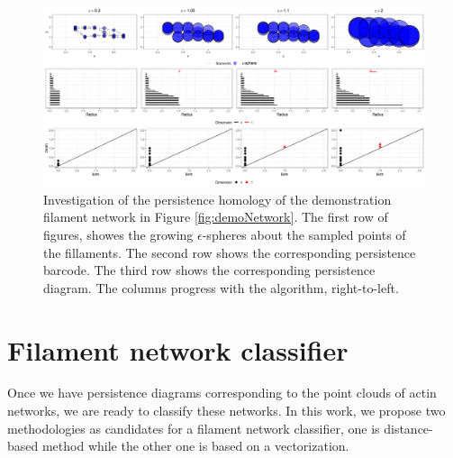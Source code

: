 \documentclass[10pt]{article}
\begin{document}
\begin{figure}[!htbp]
	\begin{center}
		\includegraphics[width=1\textwidth]{figures/filaments_rips.png}
	\end{center}
	\caption{Investigation of the persistence homology of the demonstration filament network in Figure \ref{fig:demoNetwork}. The first row of figures, showes the growing $\epsilon$-spheres about the sampled points of the fillaments. The second row shows the corresponding persistence barcode. The third row shows the corresponding persistence diagram. The columns progress with the algorithm, right-to-left.}
	\label{fig:persistencediagram}
\end{figure}

\section{Filament network classifier}
Once we have persistence diagrams corresponding to the point clouds of actin networks, we are ready to classify these networks. In this work, we propose two methodologies as candidates for a filament network classifier, one is distance-based method while the other one is based on a vectorization.
\end{document}
